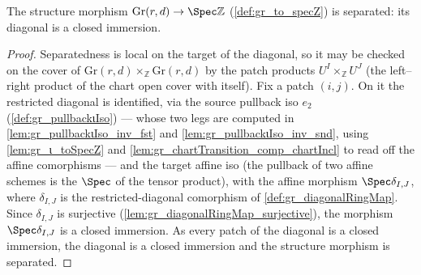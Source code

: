 \begin{lemma}

  \label{lem:gr_separated_toSpecZ}
  The structure morphism \(\mathrm{Gr}(r,d) \to \Spec \mathbb{Z}\)
  (\cref{def:gr_to_specZ}) is separated: its diagonal is a closed immersion.
\end{lemma}
\begin{proof}
    \leanok
  Separatedness is local on the target of the diagonal, so it may be checked on
  the cover of \(\mathrm{Gr}(r,d) \times_{\mathbb{Z}} \mathrm{Gr}(r,d)\) by the
  patch products \(U^I \times_{\mathbb{Z}} U^J\) (the left--right product of the
  chart open cover with itself). Fix a patch \((i,j)\). On it the restricted
  diagonal is identified, via the source pullback iso \(e_2\)
  (\cref{def:gr_pullbackιIso}) — whose two legs are computed in
  \cref{lem:gr_pullbackιIso_inv_fst} and \cref{lem:gr_pullbackιIso_inv_snd},
  using \cref{lem:gr_ι_toSpecZ} and \cref{lem:gr_chartTransition_comp_chartIncl}
  to read off the affine comorphisms — and the target affine iso (the pullback of
  two affine schemes is the \(\Spec\) of the tensor product), with the affine
  morphism \(\Spec \delta_{I,J}\), where \(\delta_{I,J}\) is the
  restricted-diagonal comorphism of \cref{def:gr_diagonalRingMap}. Since
  \(\delta_{I,J}\) is surjective (\cref{lem:gr_diagonalRingMap_surjective}), the
  morphism \(\Spec \delta_{I,J}\) is a closed immersion. As every patch of the
  diagonal is a closed immersion, the diagonal is a closed immersion and the
  structure morphism is separated.
\end{proof}

